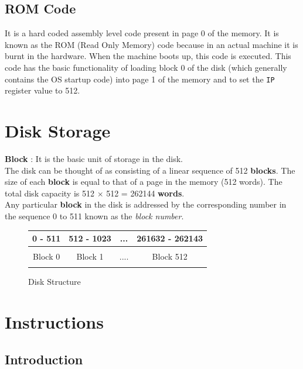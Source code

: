 \documentclass[11pt]{report}
\begin{document}
\section{ROM Code}
\label{lbl:romcode}
It is a hard coded assembly level code present in page 0 of the memory. It is known as the ROM (Read Only Memory) code because in an actual machine it is burnt in the hardware. When the machine boots up, this code is executed. This code has the basic functionality of loading block 0 of the disk (which generally contains the OS startup code) into page 1 of the memory and to set the \texttt{IP} register value to 512.



\chapter{Disk Storage}


\textbf{Block} : It is the basic unit of storage in the disk.\\

The disk can be thought of as consisting of a linear sequence of 512  \textbf{blocks}. The size of each \textbf{block} is equal to that of a page in the memory (512 words). The total disk capacity is 512 $\times$ 512 = 262144 \textbf{words}.\\

Any particular \textbf{block} in the disk is addressed by the corresponding number in the sequence 0 to 511 known as the \textit{block number}.

\begin{figure}[htp!] \small
	\centering
	\begin{tabular}{|c|c|c|c|} 
	\hline
       0 - 511 & 512 - 1023 & ... &   261632 - 262143     \\
       \hline      
      & & & \\ 
      Block 0 & Block 1  & .... & Block 512 \\ 
      & & & \\       
       \hline
       
	\end{tabular}
	\caption{Disk Structure}
	\label{fig:mem_struct}
\end{figure}




 \chapter{Instructions}
\label{sec:inst}
\section{Introduction}
\end{document}
